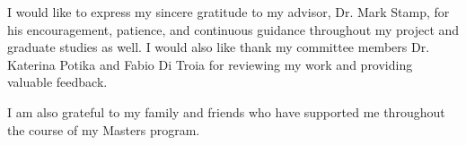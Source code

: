 I would like to express my sincere gratitude to my advisor, Dr. Mark Stamp, for his encouragement, patience, and continuous guidance throughout my project and graduate studies as well. I would also like thank my committee members Dr. Katerina Potika and Fabio Di Troia for reviewing my work and providing valuable feedback.

I am also grateful to my family and friends who have supported me throughout the course of my Masters program.